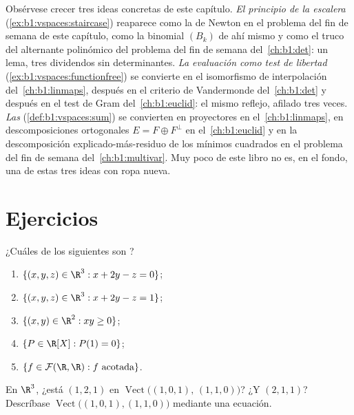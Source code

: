 \begin{remark}
\label{rem:b1:vspaces:threads}
Obsérvese crecer tres ideas concretas de este capítulo.
\emph{El principio de la escalera}
(\cref{ex:b1:vspaces:staircase}) reaparece como la  de Newton en
el problema del fin de semana de este capítulo, como la 
binomial $(B_k)$ de ahí mismo y como el truco del alternante
polinómico del problema del fin de semana del~\cref{ch:b1:det}: un
lema, tres dividendos sin determinantes.
\emph{La evaluación como test de libertad}
(\cref{ex:b1:vspaces:functionfree}) se convierte en el isomorfismo de
interpolación del~\cref{ch:b1:linmaps}, después en el criterio de
Vandermonde del~\cref{ch:b1:det} y después en el test de Gram
del~\cref{ch:b1:euclid}: el mismo reflejo, afilado tres veces.
\emph{Las } (\cref{def:b1:vspaces:sum}) se convierten en
proyectores en el~\cref{ch:b1:linmaps}, en descomposiciones
ortogonales $E = F \oplus F^\perp$ en el~\cref{ch:b1:euclid} y en la
descomposición explicado-más-residuo de los mínimos cuadrados en el
problema del fin de semana del~\cref{ch:b1:multivar}. Muy poco de
este libro no es, en el fondo, una de estas tres ideas con ropa nueva.
\end{remark}

\section{Ejercicios}

\begin{exercise}[$\star$]\label{exo:b1:vspaces:1}
¿Cuáles de los siguientes son ?
\begin{enumerate}
  \item $\{(x, y, z) \in \R^3 : x + 2y - z = 0\}$;
  \item $\{(x, y, z) \in \R^3 : x + 2y - z = 1\}$;
  \item $\{(x, y) \in \R^2 : xy \geq 0\}$;
  \item $\{P \in \R[X] : P(1) = 0\}$;
  \item $\{f \in \mathcal{F}(\R,\R) : f \text{ acotada}\}$.
\end{enumerate}
\end{exercise}

\begin{exercise}[$\star$]\label{exo:b1:vspaces:2}
En $\R^3$, ¿está $(1, 2, 1)$ en
$\operatorname{Vect}\bigl((1,0,1),\, (1,1,0)\bigr)$? ¿Y $(2, 1, 1)$?
Descríbase $\operatorname{Vect}\bigl((1,0,1),(1,1,0)\bigr)$ mediante
una ecuación.
\end{exercise}

